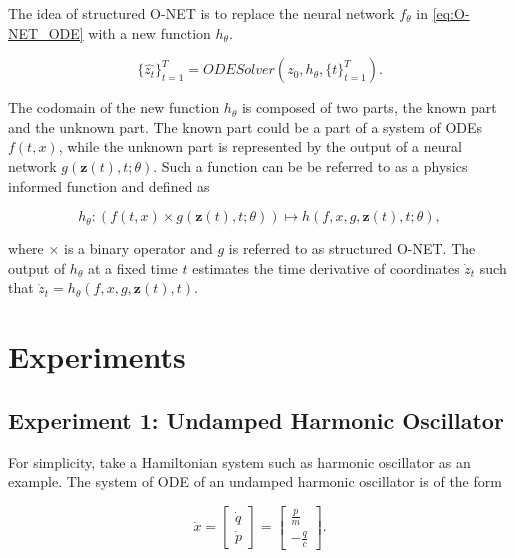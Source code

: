 \documentclass[
	parskip, 			   %
	twoside, 			   %
	DIV=14, 			   %
	BCOR=15.0mm, 		   %
	headsepline, 		   %
	open=right, 		   %
	captions=tableheading, %
	bibliography=totoc,    %
	numbers=noenddot       %
]{scrreprt}
\begin{document}
The idea of structured O-NET is to replace the neural network $f_{\theta}$ in \ref{eq:O-NET_ODE} with a new function $h_{\theta}$. 

\begin{equation}
    \label{eq:structured_O-NET_ODE}
    \{ \hat{z_{t}} \}_{t=1}^{T} = ODESolver(z_{0}, h_{\theta}, \{ t \}_{t=1}^{T}).
\end{equation}

The codomain of the new function $h_{\theta}$ is composed of two parts, the known part and the unknown part. The known part could be a part of a system of ODEs $f(t, x)$, while the unknown part is represented by the output of a neural network $g(\mathbf{z}(t), t; \theta)$. Such a function can be be referred to as a physics informed function and defined as

\begin{equation}
    \label{eq:physics_informed_function}
    h_{\theta} : \left( f(t, x) \times g(\mathbf{z}(t), t; \theta) \right) \longmapsto h(f, x, g, \mathbf{z}(t), t; \theta),
\end{equation}

where $\times$ is a binary operator and $g$ is referred to as structured O-NET. The output of $h_{\theta}$ at a fixed time $t$ estimates the time derivative of coordinates $\dot z_{t}$ such that $\dot z_{t} = h_{\theta}(f, x, g, \mathbf{z}(t), t)$.


\section{Experiments}
\subsection{Experiment 1: Undamped Harmonic Oscillator}
For simplicity, take a Hamiltonian system such as harmonic oscillator as an example. The system of ODE of an undamped harmonic oscillator is of the form

\begin{equation}
    \label{eq:ODE_udho}
    \dot{x} =
    \begin{bmatrix}
    \dot{q}\\
    \dot{p}
    \end{bmatrix}
    =
    \begin{bmatrix}
    \frac{p}{m}\\
    -\frac{q}{c}
    \end{bmatrix}.
\end{equation}
\end{document}
